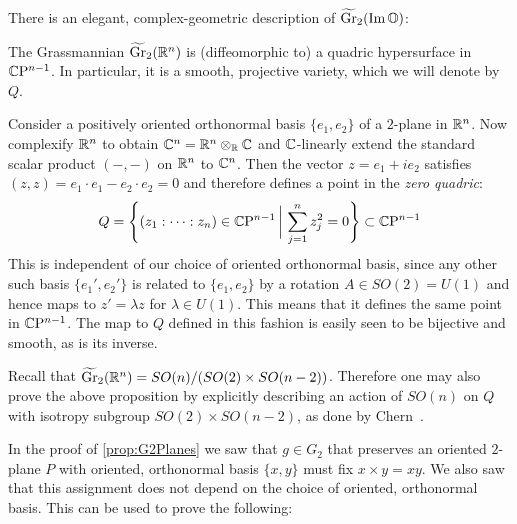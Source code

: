 There is an elegant, complex-geometric description of $\widetilde{\operatorname{Gr}}_2(\operatorname{Im}\mathbb{O})$:

\begin{prop}
	The Grassmannian $\widetilde{\operatorname{Gr}}_2(\mathbb{R}^n)$ is (diffeomorphic to) a quadric hypersurface in $\mathbb{C}\mathrm{P}^{n-1}$. In particular, it is a smooth, projective variety, which we will denote by $Q$.
\end{prop}
\begin{myproof}
	Consider a positively oriented orthonormal basis $\{e_1,e_2\}$ of a $2$-plane in $\mathbb{R}^n$. Now complexify $\mathbb{R}^n$ to obtain $\mathbb{C}^n=\mathbb{R}^n\otimes_{\mathbb{R}} \mathbb{C}$ and $\mathbb{C}$-linearly extend the standard scalar product $(-,-)$ on $\mathbb{R}^n$ to $\mathbb{C}^n$. Then the vector $z=e_1+ie_2$ satisfies $(z,z)=e_1\cdot e_1-e_2\cdot e_2=0$ and therefore defines a point in the \emph{zero quadric}:
	\begin{equation*}
		Q=\Bigg\{(z_1:\dots:z_n)\in \mathbb{C}\mathrm{P}^{n-1}\, \bigg|\, \sum_{j=1}^n z_j^2=0\Bigg\}\subset \mathbb{C}\mathrm{P}^{n-1}
	\end{equation*}
	This is independent of our choice of oriented orthonormal basis, since any other such basis $\{e_1',e_2'\}$ is related to $\{e_1,e_2\}$ by a rotation $A\in SO(2)=U(1)$ and hence maps to $z'=\lambda z$ for $\lambda\in U(1)$. This means that it defines the same point in $\mathbb{C}\mathrm{P}^{n-1}$. The map to $Q$ defined in this fashion is easily seen to be bijective and smooth, as is its inverse.
\end{myproof}

\begin{rem}
	Recall that $\widetilde{\operatorname{Gr}}_2 (\mathbb{R}^n)=SO(n)/(SO(2)\times SO(n-2))$. Therefore one may also prove the above proposition by explicitly describing an action of $SO(n)$ on $Q$ with isotropy subgroup $SO(2)\times SO(n-2)$, as done by Chern~\cite[188]{Che1965}.
\end{rem}

In the proof of \cref{prop:G2Planes} we saw that $g\in G_2$ that preserves an oriented $2$-plane $P$ with oriented, orthonormal basis $\{x,y\}$ must fix $x\times y=xy$. We also saw that this assignment does not depend on the choice of oriented, orthonormal basis. This can be used to prove the following:

